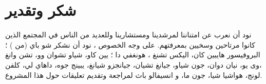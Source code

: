 \documentclass[12pt, a4paper, leqno]{report}
\makeatletter
\newenvironment{figurehere}
 {\def\@captype{figure}}
 {}
\theoremstyle{plain}
\theoremstyle{definition}
\makeatother
\begin{document}
\chapter{شكر وتقدير}
\begin{multicols}{2}
\begin{otherlanguage}{arabic}
نود أن نعرب عن امتناننا لمرشدينا ومستشارينا وللعديد من الناس في المجتمع الذين كانوا مرتاحين وسخيين بمعرفتهم. على وجه الخصوص ، نود أن   نشكر شو باي (من ) ؛ البروفيسور هايبين كان، اليكس تشنغ ، هونغفي دا ؛ يين كاو، شياو تشوان وو، تشن وانغ ،وى يو، نيان دوان، جون شياو، جيانغ تشيان، جيانجزو شيانغ، يبينج جوه، داهاي لي، كلفن لونج، هواشيا شيا، جون ما، و انسيفالو باث  لمراجعة وتقديم تعليقات حول هذا المشروع.
\end{otherlanguage}



\begin{otherlanguage}{english}


\end{otherlanguage}
\end{multicols}
\setcounter{page}{0}
%
%
\end{document}
